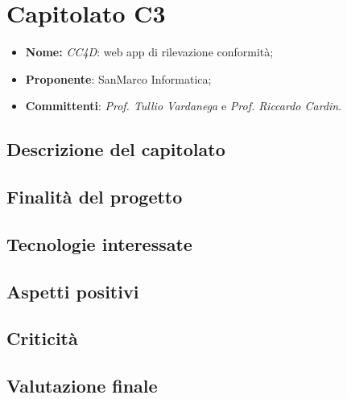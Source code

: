 \section{Capitolato C3}
		\begin{itemize}
			\item \textbf{Nome:} \textit{CC4D}: web app di rilevazione conformità;
			\item \textbf{Proponente}: SanMarco Informatica;
			\item \textbf{Committenti}: \textit{Prof. Tullio Vardanega} e \textit{Prof. Riccardo Cardin}.
		\end{itemize}
		\subsection{Descrizione del capitolato}
		\subsection{Finalità del progetto}
		\subsection{Tecnologie interessate}
		\subsection{Aspetti positivi}
		\subsection{Criticità}
		\subsection{Valutazione finale}